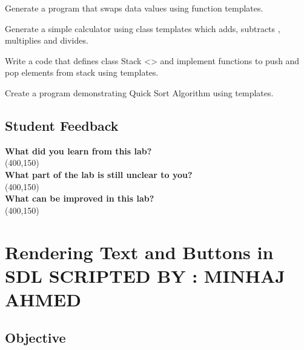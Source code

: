\documentclass[11pt,fleqn]{book} %
\begin{document}
\begin{problem} Generate a program that swaps data values using function templates.\\
\end{problem}
\begin{problem} Generate a simple calculator using class templates which adds, subtracts , multiplies and divides.\\
\end{problem}
\begin{problem} Write a code that defines class Stack <> and implement functions to push and pop elements from stack using templates.\\
\end{problem}
\begin{problem} Create a program demonstrating Quick Sort Algorithm using templates.
\end{problem}

\newpage
\section{Student Feedback}
\textbf{What did you learn from this lab?}\\ 
\framebox(400,150){}\\
\textbf{What part of the lab is still unclear to you?}\\
\framebox(400,150){}\\
\textbf{What can be improved in this lab?}\\ 
\framebox(400,150){}\\

\newpage
\pagestyle{empty} %

\cleardoublepage %

\pagestyle{fancy} %


\chapter{Rendering Text and Buttons in SDL \hspace{1mm} {\textsc{\small SCRIPTED BY : MINHAJ AHMED}}}

\section{Objective}
\end{document}
